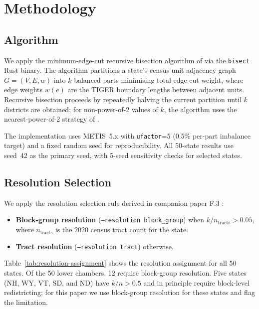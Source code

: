 \section{Methodology}
\label{sec:methodology}

\subsection{Algorithm}
\label{sec:methodology:algorithm}

We apply the minimum-edge-cut recursive bisection algorithm of
\citet{dellaLibera2026recursive} via the \texttt{bisect} Rust binary.
The algorithm partitions a state's census-unit adjacency graph
$G = (V, E, w)$ into $k$ balanced parts minimising total edge-cut weight,
where edge weights $w(e)$ are the TIGER boundary lengths between adjacent units.
Recursive bisection proceeds by repeatedly halving the current partition
until $k$ districts are obtained; for non-power-of-2 values of $k$, the
algorithm uses the nearest-power-of-2 strategy of \citet{dellaLibera2026nwayRecursive}.

The implementation uses METIS~5.x \citep{karypis1998fast} with
\texttt{ufactor}=5 (0.5\% per-part imbalance target) and a fixed
random seed for reproducibility. All 50-state results use seed~42
as the primary seed, with 5-seed sensitivity checks for selected states.

\subsection{Resolution Selection}
\label{sec:methodology:resolution}

We apply the resolution selection rule derived in companion paper F.3
\citep{dellaLibera2026stateLegResolution}:
\begin{itemize}
  \item \textbf{Block-group resolution} (\texttt{--resolution block\_group})
    when $k / n_{\mathrm{tracts}} > 0.05$, where $n_{\mathrm{tracts}}$ is
    the 2020 census tract count for the state.
  \item \textbf{Tract resolution} (\texttt{--resolution tract}) otherwise.
\end{itemize}

Table~\ref{tab:resolution-assignment} shows the resolution assignment for
all 50 states. Of the 50 lower chambers, 12 require block-group resolution.
Five states (NH, WY, VT, SD, and ND) have $k/n > 0.5$ and in principle
require block-level redistricting; for this paper we use block-group
resolution for these states and flag the limitation.

